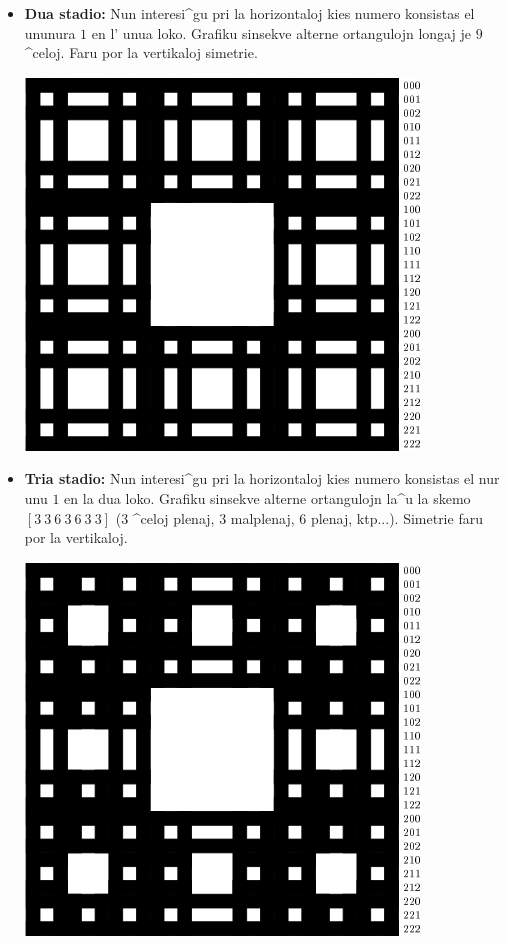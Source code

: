 \begin{itemize}
\begin{center}
\end{center}
\vspace{0.2cm}
\item [\textbullet] \textbf{Dua stadio:} Nun interesi^gu pri la
  horizontaloj kies numero konsistas el ununura $1$ en l' unua loko.
  Grafiku sinsekve alterne ortangulojn longaj je $9$ ^celoj.  Faru
  por la vertikaloj simetrie.
\begin{center}
\includegraphics{bildoj/menger-schema04.png}
\end{center} 
\item [\textbullet] \textbf{Tria stadio:} Nun interesi^gu pri la
  horizontaloj kies numero konsistas el nur unu $1$ en la dua loko.
  Grafiku sinsekve alterne ortangulojn la^u la skemo $[3\ 3\ 6\ 3\ 6\
  3\ 3]$ ($3$ ^celoj plenaj, $3$ malplenaj, $6$ plenaj, ktp...).
  Simetrie faru por la vertikaloj.
\begin{center}
\includegraphics{bildoj/menger-schema05.png}

\end{center}
\end{itemize}

